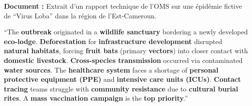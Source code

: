 \documentclass[11pt]{article}
\begin{document}
\begin{exercice}
\textbf{Document :} Extrait d'un rapport technique de l'OMS sur une épidémie fictive de ``Virus Loba'' dans la région de l'Est-Cameroun.

``The \textbf{outbreak} originated in a \textbf{wildlife sanctuary} bordering a newly developed \textbf{eco-lodge}. \textbf{Deforestation} for \textbf{infrastructure development} disrupted \textbf{natural habitats}, forcing \textbf{fruit bats} (primary \textbf{vectors}) into closer contact with \textbf{domestic livestock}. \textbf{Cross-species transmission} occurred via contaminated \textbf{water sources}. The \textbf{healthcare system} faces a shortage of \textbf{personal protective equipment (PPE)} and \textbf{intensive care units (ICUs)}. \textbf{Contact tracing} teams struggle with \textbf{community resistance} due to \textbf{cultural burial rites}. A \textbf{mass vaccination campaign} is the \textbf{top priority}.''


\end{exercice}
\end{document}
